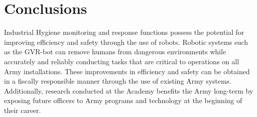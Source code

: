 \section{Conclusions}\label{conclusions}
Industrial Hygiene monitoring and response functions possess the potential for improving efficiency and safety through the use of robots. Robotic systems such as the GVR-bot can remove humans from dangerous environments while accurately and reliably conducting tasks that are critical to operations on all Army installations. These improvements in efficiency and safety can be obtained in a fiscally responsible manner through the use of existing Army systems. Additionally, research conducted at the Academy benefits the Army long-term by exposing future officers to Army programs and technology at the beginning of their career.
